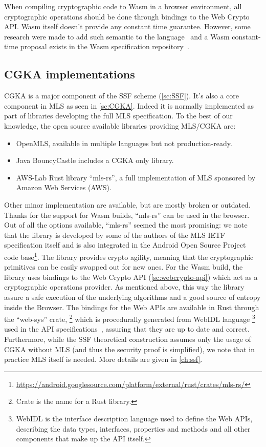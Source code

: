 When compiling cryptographic code to Wasm in a browser environment,
all cryptographic operations should be done through bindings to
the Web Crypto API. Wasm itself doesn't provide any constant time
guarantee. However, some research were made to add such semantic
to the language~\cite{CTWasm, gu2023constanttimewasmtimerealtime}
and a Wasm constant-time proposal exists in the Wasm specification
repository~\cite{WasmCTProposal}.

\subsection{CGKA implementations}\label{sc:CGKA-implementations}

CGKA is a major component of the SSF scheme (\cref{sc:SSF}).
It's also a core component in MLS as seen in \cref{sc:CGKA}.
Indeed it is normally implemented as part of libraries developing
the full MLS specification.
To the best of our knowledge, the open source available libraries
providing MLS/CGKA are:
\begin{itemize}
    \item OpenMLS, available in multiple languages but not production-ready.
    \item Java BouncyCastle includes a CGKA only library.
    \item AWS-Lab Rust library ``mls-rs'', a full implementation of MLS sponsored by Amazon Web Services (AWS). 
\end{itemize}

Other minor implementation are available, but are mostly broken or outdated.
Thanks for the support for Wasm builds, ``mls-rs'' can be used in the browser.
Out of all the options available, ``mls-rs'' seemed the most promising:
we note that the library is developed by some of the authors of the MLS IETF
specification itself and is also integrated in the Android Open Source Project
code base\footnote{\url{https://android.googlesource.com/platform/external/rust/crates/mls-rs/}}.
The library provides crypto agility, meaning that the cryptographic
primitives can be easily swapped out for new ones.
For the Wasm build, the library uses bindings to the Web Crypto API 
(\cref{sc:webcrypto-api}) which act as a cryptographic operations provider.
As mentioned above, this way the library assure a safe execution of the underlying
algorithms and a good source of entropy inside the Browser. 
The bindings for the Web APIs are available in Rust 
through the ``web-sys'' crate,
\footnote{Crate is the name for a Rust library.}
which is procedurally generated from WebIDL language
\footnote{WebIDL is the interface description language used to define the Web APIs, describing the data types, interfaces, properties and methods and all other components that make up the API itself.} 
used in the API specifications~\cite{WebSys}, assuring
that they are up to date and correct.
Furthermore, while the SSF theoretical construction
assumes only the usage of CGKA without MLS (and thus the security proof
is simplified), we note that in practice MLS itself is needed.
More details are given in \cref{ch:ssf}.

